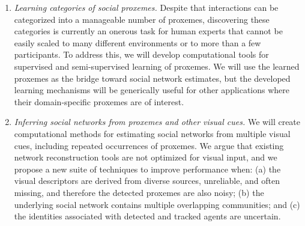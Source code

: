\begin{enumerate}


\vspace{-0.1in}\item \emph{Learning categories of social proxemes.} Despite that interactions can be categorized into a manageable number of proxemes, discovering these categories is currently an onerous task for human experts that cannot be easily scaled to many different environments or to more than a few participants. To address this, we will develop computational tools for supervised and semi-supervised learning of proxemes. We will use the learned proxemes as the bridge toward social network estimates, but the developed learning mechanisms will be generically useful for other applications where their domain-specific proxemes are of interest. 


\vspace{-0.1in}\item \emph{Inferring social networks from proxemes and other visual cues.} We will create computational methods for estimating social networks from multiple visual cues, including repeated occurrences of proxemes. We argue that existing network reconstruction tools are not optimized for visual input, and we propose a new suite of techniques to improve performance when: (a) the visual descriptors are derived from diverse sources, unreliable, and often missing, and therefore the detected proxemes are also noisy; (b) the underlying social network contains multiple overlapping communities; and (c) the identities associated with detected and tracked agents are uncertain. 



\end{enumerate}
